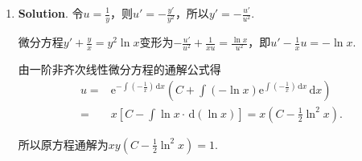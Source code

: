 \documentclass[../Main.tex]{subfiles}
\begin{document}
\begin{enumerate}
    \item \textbf{Solution}. 令$u=\frac{1}{y}$，则$u'=-\frac{y'}{y^{2}}$，所以$y
              '=-\frac{u'}{u^{2}}$.

          微分方程$y'+\frac{y}{x}=y^{2}\ln x$变形为$-\frac{u'}{u^{2}}+\frac{1}{xu}=\frac{\ln
                  x}{u^{2}}$，即$u'-\frac{1}{x}u=-\ln x$.

          由一阶非齐次线性微分方程的通解公式得
          \[
              \begin{aligned}
                  u = & \mathrm{e}^{-\int\left(-\frac{1}{x}\right)\,\mathrm{d}x}\left(C+\int\left(-\ln x\right)\mathrm{e}^{\int\left(-\frac{1}{x}\right)\,\mathrm{d}x}\,\mathrm{d}x\right) \\
                  =   & x\left[C-\int\ln x\cdot\,\mathrm{d}\left(\ln x\right)\right] = x\left(C-\frac{1}{2}\ln^{2} x\right).
              \end{aligned}
          \]

          所以原方程通解为$xy\left(C-\frac{1}{2}\ln^{2} x\right)=1$.
\end{enumerate}
\end{document}
